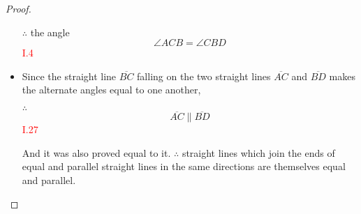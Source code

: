 \begin{proof}
\begin{itemize}
\item[$\therefore$] the angle 
\[\angle{ACB} = \angle{CBD}\]\hfill\textcolor{red}{I.4}

\item Since the straight line $\overline{BC}$ falling on the two straight lines $\overline{AC}$ and $\overline{BD}$ makes the alternate angles equal to one another, 

\item[$\therefore$] 
\[\overline{AC} \parallel \overline{BD}\]\hfill\textcolor{red}{I.27}

And it was also proved equal to it. $\therefore$ straight lines which join the ends of equal and parallel straight lines in the same directions are themselves equal and parallel.

\end{itemize}

\end{proof}

\clearpage
	